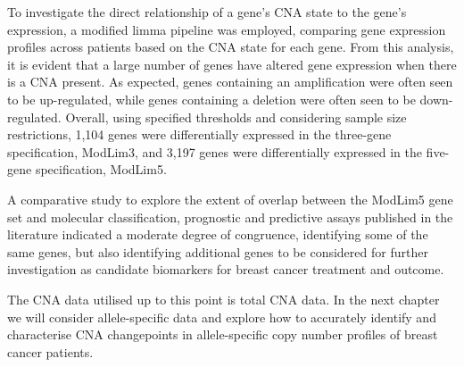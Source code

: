 To investigate the direct relationship of a gene's CNA state to the gene's expression, a modified limma pipeline was employed, comparing gene expression profiles across patients based on the CNA state for each gene. From this analysis, it is evident that a large number of genes have altered gene expression when there is a CNA present. As expected, genes containing an amplification were often seen to be up-regulated, while genes containing a deletion were often seen to be down-regulated. Overall, using specified thresholds and considering sample size restrictions, 1,104 genes were differentially expressed in the three-gene specification, ModLim3, and 3,197 genes were differentially expressed in the five-gene specification, ModLim5. 

A comparative study to explore the extent of overlap between the ModLim5 gene set and molecular classification, prognostic and predictive assays published in the literature indicated a moderate degree of congruence, identifying some of the same genes, but also identifying additional genes to be considered for further investigation as candidate biomarkers for breast cancer treatment and outcome.

The CNA data utilised up to this point is total CNA data. In the next chapter we will consider allele-specific data and explore how to accurately identify and characterise CNA changepoints in allele-specific copy number profiles of breast cancer patients.